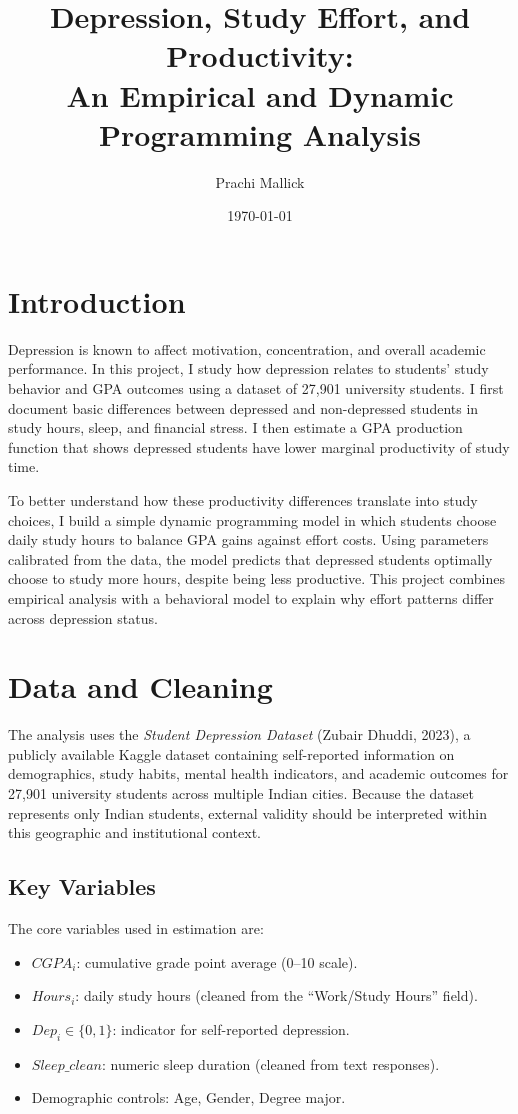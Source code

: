 \documentclass[12pt]{article}
\title{Depression, Study Effort, and Productivity:\\ 
An Empirical and Dynamic Programming Analysis}
\author{Prachi Mallick}
\date{\today}
\begin{document}
\maketitle
\doublespacing

\section{Introduction}

Depression is known to affect motivation, concentration, and overall academic
performance. In this project, I study how depression relates to students'
study behavior and GPA outcomes using a dataset of 27,901 university students.
I first document basic differences between depressed and non-depressed students
in study hours, sleep, and financial stress. I then estimate a GPA production
function that shows depressed students have lower marginal productivity of
study time.

To better understand how these productivity differences translate into study
choices, I build a simple dynamic programming model in which students choose
daily study hours to balance GPA gains against effort costs. Using parameters
calibrated from the data, the model predicts that depressed students optimally
choose to study more hours, despite being less productive. This project combines
empirical analysis with a behavioral model to explain why effort patterns differ
across depression status.


\section{Data and Cleaning}

The analysis uses the \textit{Student Depression Dataset} (Zubair Dhuddi, 2023), 
a publicly available Kaggle dataset containing self-reported information on 
demographics, study habits, mental health indicators, and academic outcomes for 
27{,}901 university students across multiple Indian cities. Because the dataset 
represents only Indian students, external validity should be interpreted within 
this geographic and institutional context.

\subsection{Key Variables}

The core variables used in estimation are:
\begin{itemize}
    \item $CGPA_i$: cumulative grade point average (0--10 scale).
    \item $Hours_i$: daily study hours (cleaned from the ``Work/Study Hours'' field).
    \item $Dep_i \in \{0,1\}$: indicator for self-reported depression.
    \item $Sleep\_clean$: numeric sleep duration (cleaned from text responses).
    \item Demographic controls: Age, Gender, Degree major.
\end{itemize}
\end{document}
